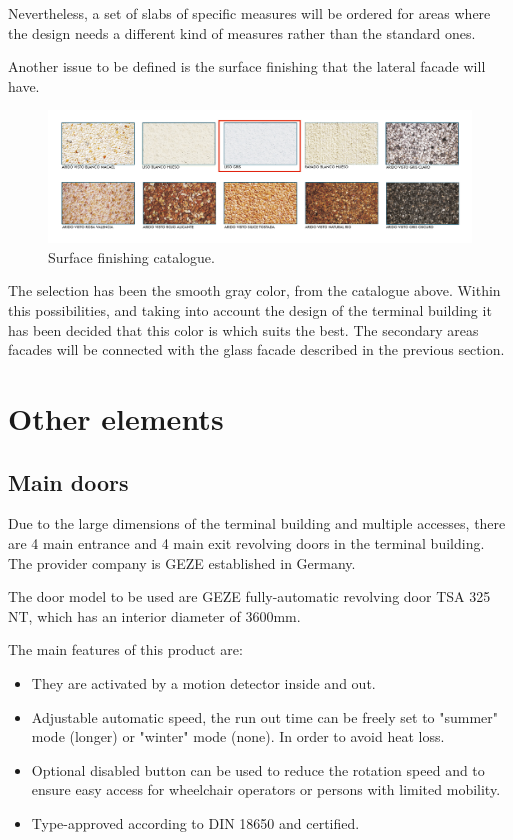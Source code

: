 Nevertheless, a set of slabs of specific measures will be ordered for areas where the design needs a different kind of measures rather than the standard ones. 

Another issue to be defined is the surface finishing that the lateral facade will have.

	\begin{figure}[H]
	\centering
\includegraphics[width=13cm]{./images/Facade/finishing}
\caption{Surface finishing catalogue.}
\end{figure}

The selection has been the smooth gray color, from the catalogue above. Within this possibilities, and taking into account the design of the terminal building it has been decided that this color is which suits the best. The secondary areas facades will be connected with the glass facade described in the previous section.




	\section{Other elements}
		\subsection{Main doors}
	Due to the large dimensions of the terminal building and multiple accesses, there are 4 main entrance and 4 main exit revolving doors in the terminal building. The provider company is GEZE established in Germany.
	
	The door model to be used are GEZE fully-automatic revolving door TSA 325 NT, which has an interior diameter of 3600mm.
	
	The main features of this product are:
	\begin{itemize}
	\item They are activated by a motion detector inside and out.
	\item Adjustable automatic speed, the run out time can be freely set to "summer" mode (longer) or "winter" mode (none). In order to avoid heat loss.
	\item Optional disabled button can be used to reduce the rotation speed and to ensure easy access for wheelchair operators or persons with limited mobility.	
	\item Type-approved according to DIN 18650 and certified.
	\end{itemize}
	
